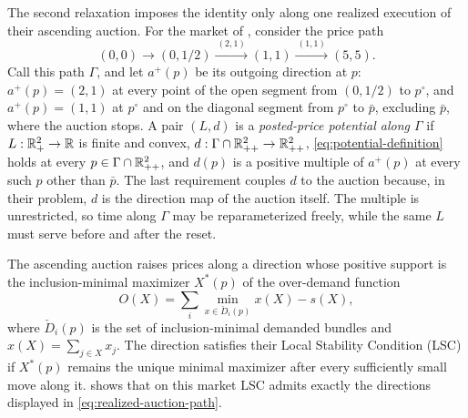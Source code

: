 The second relaxation imposes the identity only along one realized execution of their ascending auction. For the market of , consider the price path
\begin{equation}\label{eq:realized-auction-path}
(0,0)\longrightarrow(0,1/2)
\xrightarrow{\ (2,1)\ }(1,1)
\xrightarrow{\ (1,1)\ }(5,5).
\end{equation}
Call this path $\Gamma$, and let $a^+(p)$ be its outgoing direction at $p$: $a^+(p)=(2,1)$ at every point of the open segment from $(0,1/2)$ to $p^\circ$, and $a^+(p)=(1,1)$ at $p^\circ$ and on the diagonal segment from $p^\circ$ to $\bar p$, excluding $\bar p$, where the auction stops. A pair $(L,d)$ is a \emph{posted-price potential along $\Gamma$} if $L:\mathbb{R}_+^2\to\mathbb{R}$ is finite and convex, $d:\Gamma\cap\mathbb{R}_{++}^2\to\mathbb{R}_{++}^2$, \eqref{eq:potential-definition} holds at every $p\in\Gamma\cap\mathbb{R}_{++}^2$, and $d(p)$ is a positive multiple of $a^+(p)$ at every such $p$ other than $\bar p$. The last requirement couples $d$ to the auction because, in their problem, $d$ is the direction map of the auction itself. The multiple is unrestricted, so time along $\Gamma$ may be reparameterized freely, while the same $L$ must serve before and after the reset.

The ascending auction raises prices along a direction whose positive support is the inclusion-minimal maximizer $X^*(p)$ of the over-demand function
\[
O(X)=\sum_i\min_{x\in\check D_i(p)}x(X)-s(X),
\]
where $\check D_i(p)$ is the set of inclusion-minimal demanded bundles and $x(X)=\sum_{j\in X}x_j$. The direction satisfies their Local Stability Condition (LSC) if $X^*(p)$ remains the unique minimal maximizer after every sufficiently small move along it.  shows that on this market LSC admits exactly the directions displayed in \eqref{eq:realized-auction-path}.

